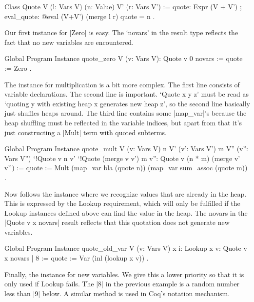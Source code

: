 \documentclass[a4paper,10pt, runningheads]{llncs}
\begin{document}
\begin{code}
  Class Quote {V} (l: Vars V) (n: Value) {V'} (r: Vars V') :=
    { quote: Expr (V + V')
    ; eval_quote: @eval (V+V') (merge l r) quote = n }.
\end{code}

Our first instance for |Zero| is easy. The `novars' in the result type reflects the fact that no
new variables are encountered.
\begin{code}
  Global Program Instance quote_zero V (v: Vars V):
    Quote v 0 novars :=
  { quote := Zero }.
\end{code}

The instance for multiplication is a bit more complex. The first line consists of
 variable declarations. The second line is important. `Quote x y z' must be read as
 `quoting y with existing heap x generates new heap z', so the second line basically just
shuffles heaps around.
 The third line contains some |map_var|'s because the heap shuffling must be
reflected in the variable indices, but apart from that it's just constructing a |Mult| term with
quoted subterms.

\begin{code}
Global Program Instance quote_mult V (v: Vars V)
  n V' (v': Vars V') m V'' (v'': Vars V'')
  `{!Quote v n v'} `{!Quote (merge v v') m v''}:
  Quote v (n * m) (merge v' v'') :=
  { quote := Mult (map_var bla (quote n)) (map_var sum_assoc (quote m)) }.
\end{code}
  Now follows the instance where we recognize values that are already in the heap. This
   is expressed by the Lookup requirement, which will only be fulfilled if the Lookup instances
   defined above can find the value in the heap. The novars in the |Quote v x novars| result
   reflects that this quotation does not generate new variables.

\begin{code}
Global Program Instance quote_old_var
  V (v: Vars V) x {i: Lookup x v}:
  Quote v x novars | 8 := { quote := Var (inl (lookup x v)) }.
\end{code}

\noindent Finally, the instance for new variables. We give this a lower priority so that it is only
used if Lookup fails. The |8| in the previous example is a random number less than |9| below. A
similar method is used in Coq's notation mechanism.
\end{document}
